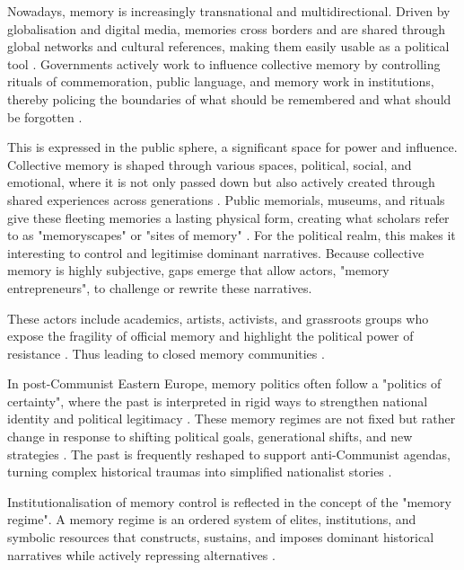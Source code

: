 Nowadays, memory is increasingly transnational and multidirectional. Driven by globalisation and digital media, memories cross borders and are shared through global networks and cultural references, making them easily usable as a political tool \citep{assmann_transnational_2014}. Governments actively work to influence collective memory by controlling rituals of commemoration, public language, and memory work in institutions, thereby policing the boundaries of what should be remembered and what should be forgotten \citep{meijen_populist_2024}.

This is expressed in the public sphere, a significant space for power and influence. Collective memory is shaped through various spaces, political, social, and emotional, where it is not only passed down but also actively created through shared experiences across generations \citep{wydra_generations_2018}. Public memorials, museums, and rituals give these fleeting memories a lasting physical form, creating what scholars refer to as "memoryscapes" \citep{bresco_de_luna_end_2017} or "sites of memory" \citep{olick_social_1998}. For the political realm, this makes it interesting to control and legitimise dominant narratives. Because collective memory is highly subjective, gaps emerge that allow actors, "memory entrepreneurs", to challenge or rewrite these narratives.

These actors include academics, artists, activists, and grassroots groups who expose the fragility of official memory and highlight the political power of resistance \citep{langenbacher_twenty-first_2008}. Thus leading to closed memory communities \citep{assmann_transnational_2014}.

In post-Communist Eastern Europe, memory politics often follow a "politics of certainty", where the past is interpreted in rigid ways to strengthen national identity and political legitimacy \citep{dujisin_reassessing_2024}. These memory regimes are not fixed but rather change in response to shifting political goals, generational shifts, and new strategies \citep{bernhard_notitle_2014}. The past is frequently reshaped to support anti-Communist agendas, turning complex historical traumas into simplified nationalist stories \citep{grabowski_memory_2018}.

Institutionalisation of memory control is reflected in the concept of the "memory regime". A memory regime is an ordered system of elites, institutions, and symbolic resources that constructs, sustains, and imposes dominant historical narratives while actively repressing alternatives \citep{langenbacher_twenty-first_2008}.

